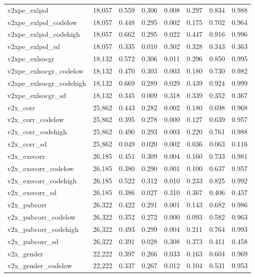 \begin{table}[!htbp]
\begin{tabular}{@{\extracolsep{5pt}}lccccccc}
v2xpe\_exlpol & 18,057 & 0.559 & 0.306 & 0.008 & 0.297 & 0.834 & 0.988 \\ 
v2xpe\_exlpol\_codelow & 18,057 & 0.448 & 0.295 & 0.002 & 0.175 & 0.702 & 0.964 \\ 
v2xpe\_exlpol\_codehigh & 18,057 & 0.662 & 0.295 & 0.022 & 0.447 & 0.916 & 0.996 \\ 
v2xpe\_exlpol\_sd & 18,057 & 0.335 & 0.010 & 0.302 & 0.328 & 0.343 & 0.363 \\ 
v2xpe\_exlsocgr & 18,132 & 0.572 & 0.306 & 0.011 & 0.296 & 0.850 & 0.995 \\ 
v2xpe\_exlsocgr\_codelow & 18,132 & 0.470 & 0.303 & 0.003 & 0.180 & 0.730 & 0.982 \\ 
v2xpe\_exlsocgr\_codehigh & 18,132 & 0.669 & 0.289 & 0.029 & 0.439 & 0.924 & 0.999 \\ 
v2xpe\_exlsocgr\_sd & 18,132 & 0.345 & 0.009 & 0.318 & 0.339 & 0.352 & 0.367 \\ 
v2x\_corr & 25,862 & 0.443 & 0.282 & 0.002 & 0.180 & 0.698 & 0.968 \\ 
v2x\_corr\_codelow & 25,862 & 0.395 & 0.278 & 0.000 & 0.127 & 0.639 & 0.957 \\ 
v2x\_corr\_codehigh & 25,862 & 0.490 & 0.293 & 0.003 & 0.220 & 0.761 & 0.988 \\ 
v2x\_corr\_sd & 25,862 & 0.049 & 0.020 & 0.002 & 0.036 & 0.063 & 0.116 \\ 
v2x\_execorr & 26,185 & 0.451 & 0.309 & 0.004 & 0.160 & 0.733 & 0.981 \\ 
v2x\_execorr\_codelow & 26,185 & 0.380 & 0.290 & 0.001 & 0.100 & 0.637 & 0.957 \\ 
v2x\_execorr\_codehigh & 26,185 & 0.522 & 0.312 & 0.010 & 0.233 & 0.825 & 0.992 \\ 
v2x\_execorr\_sd & 26,185 & 0.386 & 0.027 & 0.310 & 0.367 & 0.406 & 0.457 \\ 
v2x\_pubcorr & 26,322 & 0.422 & 0.291 & 0.001 & 0.143 & 0.682 & 0.986 \\ 
v2x\_pubcorr\_codelow & 26,322 & 0.352 & 0.272 & 0.000 & 0.093 & 0.582 & 0.963 \\ 
v2x\_pubcorr\_codehigh & 26,322 & 0.493 & 0.299 & 0.004 & 0.211 & 0.764 & 0.993 \\ 
v2x\_pubcorr\_sd & 26,322 & 0.391 & 0.028 & 0.308 & 0.373 & 0.411 & 0.458 \\ 
v2x\_gender & 22,222 & 0.397 & 0.266 & 0.033 & 0.163 & 0.604 & 0.969 \\ 
v2x\_gender\_codelow & 22,222 & 0.337 & 0.267 & 0.012 & 0.104 & 0.531 & 0.953 \\ 

\end{tabular}
\end{table}

